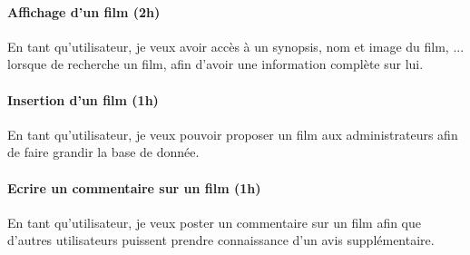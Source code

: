 \documentclass[a4paper,12pt]{article}
\begin{document}
\paragraph{Affichage d'un film (2h)}
En tant qu'utilisateur, je veux avoir accès à un synopsis, nom et image du film, ... lorsque de recherche un film, afin d'avoir une information complète sur lui.

\paragraph{Insertion d'un film (1h)}
En tant qu'utilisateur, je veux pouvoir proposer un film aux administrateurs afin de faire grandir la base de donnée.

\paragraph{Ecrire un commentaire sur un film (1h)}
En tant qu'utilisateur, je veux poster un commentaire sur un film afin que d'autres utilisateurs puissent prendre connaissance d'un avis supplémentaire.
\end{document}
